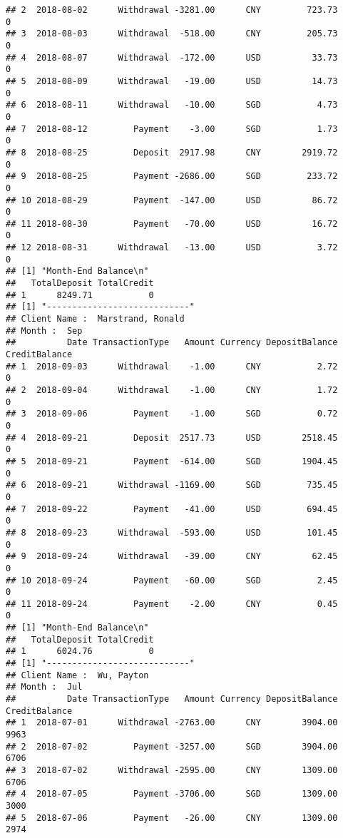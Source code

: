 \documentclass[]{article}
\begin{document}
\begin{verbatim}
## 2  2018-08-02      Withdrawal -3281.00      CNY         723.73             0
## 3  2018-08-03      Withdrawal  -518.00      CNY         205.73             0
## 4  2018-08-07      Withdrawal  -172.00      USD          33.73             0
## 5  2018-08-09      Withdrawal   -19.00      USD          14.73             0
## 6  2018-08-11      Withdrawal   -10.00      SGD           4.73             0
## 7  2018-08-12         Payment    -3.00      SGD           1.73             0
## 8  2018-08-25         Deposit  2917.98      CNY        2919.72             0
## 9  2018-08-25         Payment -2686.00      SGD         233.72             0
## 10 2018-08-29         Payment  -147.00      USD          86.72             0
## 11 2018-08-30         Payment   -70.00      USD          16.72             0
## 12 2018-08-31      Withdrawal   -13.00      USD           3.72             0
## [1] "Month-End Balance\n"
##   TotalDeposit TotalCredit
## 1      8249.71           0
## [1] "----------------------------"
## Client Name :  Marstrand, Ronald 
## Month :  Sep 
##          Date TransactionType   Amount Currency DepositBalance CreditBalance
## 1  2018-09-03      Withdrawal    -1.00      CNY           2.72             0
## 2  2018-09-04      Withdrawal    -1.00      CNY           1.72             0
## 3  2018-09-06         Payment    -1.00      SGD           0.72             0
## 4  2018-09-21         Deposit  2517.73      USD        2518.45             0
## 5  2018-09-21         Payment  -614.00      SGD        1904.45             0
## 6  2018-09-21      Withdrawal -1169.00      SGD         735.45             0
## 7  2018-09-22         Payment   -41.00      USD         694.45             0
## 8  2018-09-23      Withdrawal  -593.00      USD         101.45             0
## 9  2018-09-24      Withdrawal   -39.00      CNY          62.45             0
## 10 2018-09-24         Payment   -60.00      SGD           2.45             0
## 11 2018-09-24         Payment    -2.00      CNY           0.45             0
## [1] "Month-End Balance\n"
##   TotalDeposit TotalCredit
## 1      6024.76           0
## [1] "----------------------------"
## Client Name :  Wu, Payton 
## Month :  Jul 
##          Date TransactionType   Amount Currency DepositBalance CreditBalance
## 1  2018-07-01      Withdrawal -2763.00      CNY        3904.00          9963
## 2  2018-07-02         Payment -3257.00      SGD        3904.00          6706
## 3  2018-07-02      Withdrawal -2595.00      CNY        1309.00          6706
## 4  2018-07-05         Payment -3706.00      SGD        1309.00          3000
## 5  2018-07-06         Payment   -26.00      CNY        1309.00          2974

\end{verbatim}
\end{document}
